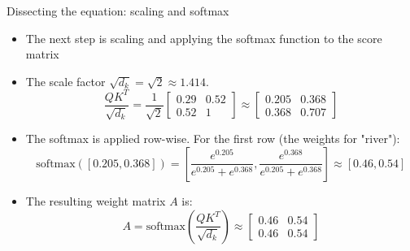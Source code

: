 \documentclass[aspectratio=169]{beamer}\usepackage[]{graphicx}\usepackage[]{xcolor}
\begin{document}
\begin{frame}{Dissecting the equation: scaling and softmax}
\begin{itemize}
\item The next step is scaling and applying the softmax function to the score matrix
\vfill
\item The scale factor $\sqrt{d_k} = \sqrt{2} \approx 1.414$.
$$ \frac{QK^T}{\sqrt{d_k}} = \frac{1}{\sqrt{2}} \begin{bmatrix} 0.29 & 0.52 \\ 0.52 & 1 \end{bmatrix} \approx \begin{bmatrix} 0.205 & 0.368 \\ 0.368 & 0.707 \end{bmatrix} $$
\vfill
\item The softmax is applied row-wise. For the first row (the weights for "river"):
  $$ \text{softmax}([0.205, 0.368]) = \left[ \frac{e^{0.205}}{e^{0.205} + e^{0.368}}, \frac{e^{0.368}}{e^{0.205} + e^{0.368}} \right] \approx [0.46, 0.54] $$
\vfill
\item The resulting weight matrix $A$ is:
  $$ A = \text{softmax}\left(\frac{QK^T}{\sqrt{d_k}}\right) \approx \begin{bmatrix} 0.46 & 0.54 \\ 0.46 & 0.54 \end{bmatrix} $$
\end{itemize}
\end{frame}
\end{document}
